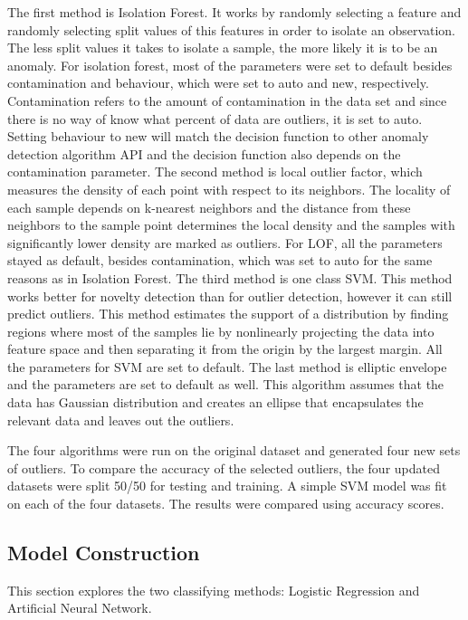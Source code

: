 \documentclass[letterpaper, 12 pt, conference]{ieeeconf}  %
\begin{document}
The first method is Isolation Forest. It works by randomly selecting a feature and randomly selecting split values of this features in order to isolate an observation. The less split values it takes to isolate a sample, the more likely it is to be an anomaly. For isolation forest, most of the parameters were set to default besides contamination and  behaviour, which were set to auto and new, respectively. Contamination refers to the amount of contamination in the data set and since there is no way of know what percent of data are outliers, it is set to auto. Setting behaviour to new will match the decision function to other anomaly detection algorithm API and the decision function also depends on the contamination parameter. The second method is local outlier factor, which measures the density of each point with respect to its neighbors. The locality of each sample depends on k-nearest neighbors and the distance from these neighbors to the sample point determines the local density and the samples with significantly lower density are marked as outliers. For LOF, all the parameters stayed as default, besides contamination, which was set to auto for the same reasons as in Isolation Forest. The third method is one class SVM. This method works better for novelty detection than for outlier detection, however it can still predict outliers. This method estimates the support of a distribution by finding regions where most of the samples lie by nonlinearly projecting the data into feature space and then separating it from the origin by the largest margin. All the parameters for SVM are set to default. The last method is elliptic envelope and the parameters are set to default as well. This algorithm assumes that the data has Gaussian distribution and creates an ellipse that encapsulates the relevant data and leaves out the outliers.
        
The four algorithms were run on the original dataset and generated four new sets of outliers. To compare the accuracy of the selected outliers, the four updated datasets were split 50/50 for testing and training. A simple SVM model was fit on each of the four datasets. The results were compared using accuracy scores. 



\subsection{Model Construction}

This section explores the two classifying methods: Logistic Regression and Artificial Neural Network.
\end{document}
